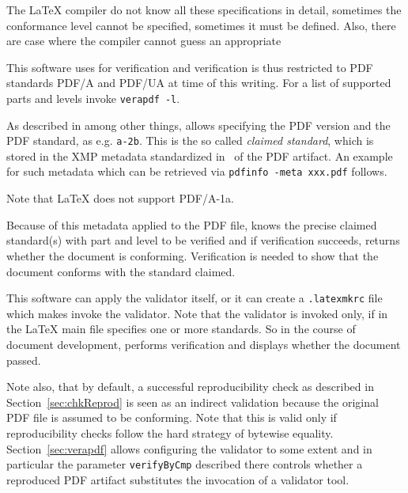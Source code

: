 The \LaTeX{} compiler do not know all these specifications in detail, 
sometimes the conformance level cannot be specified, sometimes it must be defined. 
Also, there are case where the compiler cannot guess an appropriate 

This software uses  for verification 
and verification is thus restricted to PDF standards PDF/A and PDF/UA at time of this writing. 
For a list of supported parts and levels invoke \texttt{verapdf -l}. 



As described in %
 among other things, allows specifying the PDF version and the PDF standard, 
as e.g. \texttt{a-2b}. 
This is the so called \emph{claimed standard}, 
which is stored in the XMP metadata standardized in~\cite{ISO16684-2} of the PDF artifact. 
An example for such metadata which can be retrieved via \texttt{pdfinfo -meta xxx.pdf} follows. 

Note that \LaTeX{} does not support PDF/A-1a. 


Because of this metadata  applied to the PDF file, 
knows the precise claimed standard(s) with part and level to be verified 
and if verification succeeds, returns whether the document is conforming. 
Verification is needed to show that the document conforms with the standard claimed. 

This software can apply the validator itself, or it can create a \texttt{.latexmkrc} file 
which makes  invoke the validator. %
Note that the validator is invoked only, if  in the \LaTeX{} main file specifies 
one or more standards. 
So in the course of document development,  performs verification and displays whether the document passed. 

Note also, that by default, a successful reproducibility check as described in Section~\ref{sec:chkReprod} 
is seen as an indirect validation because the original PDF file is assumed to be conforming. 
Note that this is valid only if reproducibility checks follow the hard strategy of bytewise equality. 
Section~\ref{sec:verapdf} allows configuring the validator to some extent 
and in particular the parameter \texttt{verifyByCmp} described there 
controls whether a reproduced PDF artifact substitutes the invocation of a validator tool. 



